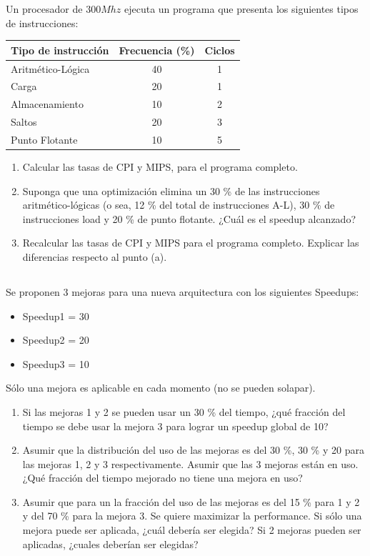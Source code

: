 Un procesador de $300 Mhz$ ejecuta un programa que presenta los siguientes tipos de instrucciones:

\begin{table}[h!]
\begin{tabular}{|l|c|c|}
\hline
 Tipo de instrucción & Frecuencia (\%)  &  Ciclos  \\ \hline
 Aritmético-Lógica & 40  &  1  \\ \hline
 Carga & 20 & 1 \\ \hline
 Almacenamiento & 10  & 2  \\ \hline
 Saltos & 20  & 3 \\ \hline
 Punto Flotante & 10 & 5  \\ \hline
\end{tabular}
\end{table}

\begin{enumerate}[label=\alph*)]
 \item Calcular las tasas de CPI y MIPS, para el programa completo.
 \item Suponga que una optimización elimina un 30 \% de las instrucciones aritmético-lógicas (o sea, 12 \% del total de instrucciones A-L), 30 \% de instrucciones load y 20 \% de punto flotante. ¿Cuál es el speedup alcanzado?
 \item Recalcular las tasas de CPI y MIPS para el programa completo. Explicar las diferencias respecto al punto (a).
\end{enumerate}

\subsection{}
Se proponen 3 mejoras para una nueva arquitectura con los siguientes Speedups:
\begin{itemize}
\item Speedup1 = 30
\item Speedup2 = 20
\item Speedup3 = 10
\end{itemize}

Sólo una mejora es aplicable en cada momento (no se pueden solapar).

\begin{enumerate}[label=\alph*)]
 \item Si las mejoras 1 y 2 se pueden usar un 30 \% del tiempo, ¿qué fracción del tiempo se debe usar la mejora 3 para lograr un speedup global de 10?
 \item Asumir que la distribución del uso de las mejoras es del 30 \%, 30 \% y 20 para las mejoras 1, 2 y 3 respectivamente. Asumir que las 3 mejoras están en uso. ¿Qué fracción del tiempo mejorado no tiene una mejora en uso?
 \item Asumir que para un \BMRK la fracción del uso de las mejoras es del 15 \% para 1 y 2 y del 70 \% para la mejora 3. Se quiere maximizar la performance. Si sólo una mejora puede ser aplicada, ¿cuál debería ser elegida? Si 2 mejoras pueden ser aplicadas, ¿cuales deberían ser elegidas?  \end{enumerate}

